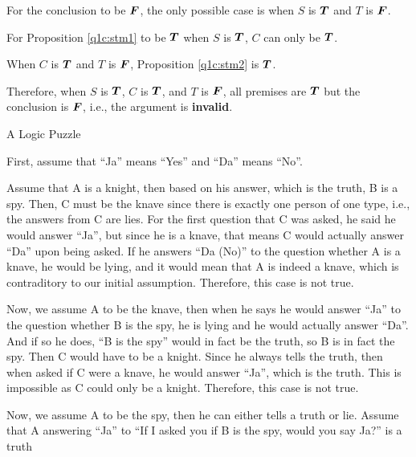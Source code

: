 \documentclass[answers]{exam}
\begin{document}
\begin{questions}
\begin{parts}
\begin{solution}
            For the conclusion to be $\bm{F}$, the only possible case is when $S$ is $\bm{T}$ and
            $T$ is $\bm{F}$.

            For Proposition \ref{q1c:stm1} to be $\bm{T}$ when $S$ is $\bm{T}$, $C$ can only be
            $\bm{T}$.
            
            When $C$ is $\bm{T}$ and $T$ is $\bm{F}$, Proposition \ref{q1c:stm2} is $\bm{T}$.

            Therefore, when $S$ is $\bm{T}$, $C$ is $\bm{T}$, and $T$ is $\bm{F}$, all premises
            are $\bm{T}$ but the conclusion is $\bm{F}$, i.e., the argument is \textbf{invalid}.
        \end{solution}

    \end{parts}

    \question A Logic Puzzle

    \begin{solution}
        First, assume that ``Ja'' means ``Yes'' and ``Da'' means ``No''.

        Assume that A is a knight, then based on his answer, which is the truth, B is
        a spy. Then, C must be the knave since there is exactly one person of one type,
        i.e., the answers from C are lies. For the first question that C was asked,
        he said he would answer ``Ja'', but since he is a knave, that means C would
        actually answer ``Da'' upon being asked. If he answers ``Da (No)'' to the question
        whether A is a knave, he would be lying, and it would mean that A is indeed a
        knave, which is contraditory to our initial assumption. Therefore, this case
        is not true.

        Now, we assume A to be the knave, then when he says he would answer ``Ja'' to
        the question whether B is the spy, he is lying and he would actually answer ``Da''.
        And if so he does, ``B is the spy'' would in fact be the truth, so B is in fact
        the spy. Then C would have to be a knight. Since he always tells the truth, then
        when asked if C were a knave, he would answer ``Ja'', which is the truth. This is
        impossible as C could only be a knight. Therefore, this case is not true.

        Now, we assume A to be the spy, then he can either tells a truth or lie. Assume
        that A answering ``Ja'' to ``If I asked you if B is the spy, would you say Ja?''
        is a truth
    \end{solution}

\end{questions}
\end{document}
